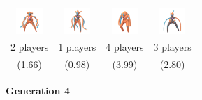 \documentclass[8pt,aspectratio=169,compress]{beamer}
\begin{document}
\begin{frame}
\begin{tiny}
\begin{block}{}
\begin{center}
\begin{tabular}{cccc}
\includegraphics[width=1cm]{../../images/pokemon/Deoxys_n} & 
\includegraphics[width=1cm]{../../images/pokemon/Deoxys_a} & 
\includegraphics[width=1cm]{../../images/pokemon/Deoxys_d} & 
\includegraphics[width=1cm]{../../images/pokemon/Deoxys_s} \\
2 players & 1 players & 4 players & 3 players \\
(1.66) & (0.98) & (3.99) &(2.80) \\
\end{tabular}
\end{center}


\textbf{Generation 4}


\end{block}
\end{tiny}
\end{frame}
\end{document}

